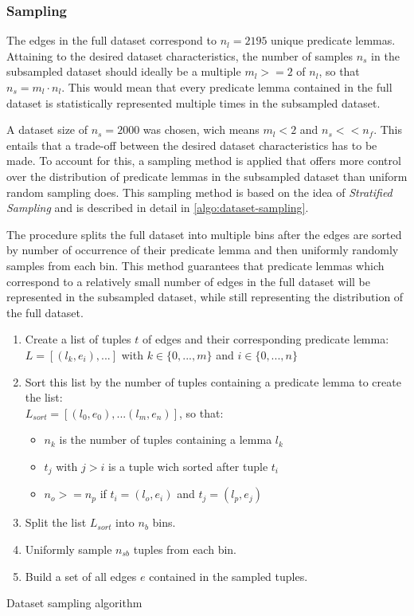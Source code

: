 \documentclass[11pt]{scrreprt}
\let\cite\parencite  %
\begin{document}
\subsubsection{Sampling} 
The edges in the full dataset correspond to \(n_{l} = 2195\) unique predicate lemmas. Attaining to the desired dataset characteristics, the number of samples \(n_{s}\) in the subsampled dataset should ideally be a multiple \(m_{l} >= 2\) of \(n_{l}\), so that \(n_{s} = m_{l} \cdot  n_{l}\). This would mean that every predicate lemma contained in the full dataset is statistically represented multiple times in the subsampled dataset.

A dataset size of \(n_{s}=2000\) was chosen, wich means \(m_{l} < 2\) and  \(n_s << n_f\). This entails that a trade-off between the desired dataset characteristics has to be made. To account for this, a sampling method is applied that offers more control over the distribution of predicate lemmas in the subsampled dataset than uniform random sampling does. This sampling method is based on the idea of \textit{Stratified Sampling} \cite{parsonsStratifiedSampling2017}  and is described in detail in \cref{algo:dataset-sampling}. 

The procedure splits the full dataset into multiple bins after the edges are sorted by number of occurrence of their predicate lemma and then uniformly randomly samples from each bin. This method guarantees that predicate lemmas which correspond to a relatively small number of edges in the full dataset will be represented in the subsampled dataset, while still representing the distribution of the full dataset. 


\begin{algorithm}
\begin{enumerate}
	\item Create a list of tuples \(t\) of edges and their corresponding predicate lemma: \\ \(L = [(l_k, e_i), ...]\) with \(k \in \{0,...,m\}\) and \(i \in \{0,...,n\}\)
	\item Sort this list by the number of tuples containing a predicate lemma to create the list: \\ \(L_{sort} = [(l_0, e_0), ... (l_m, e_n)]\), so that:
	\begin{itemize}
		\item \(n_k\) is the number of tuples containing a lemma \(l_k\)
		\item \(t_j\) with \(j > i\) is a tuple wich sorted after tuple \(t_i\)
		\item \(n_o >= n_p\) if \(t_i = (l_o, e_i)\) and \(t_j = (l_p, e_j)\)
	\end{itemize}			
	\item Split the list \(L_{sort}\) into \(n_{b}\) bins.
	\item Uniformly sample \(n_{sb}\) tuples from each bin.
	\item Build a set of all edges \(e\) contained in the sampled tuples.
\end{enumerate}
\caption{Dataset sampling algorithm}
\label{algo:dataset-sampling}
\end{algorithm}
\end{document}
